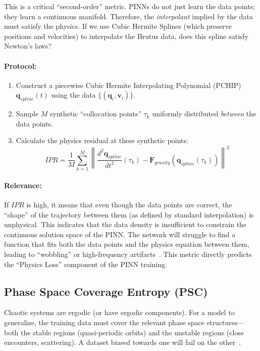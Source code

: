 \documentclass[11pt, a4paper]{article}
\newcommand{\vect}[1]{\mathbf{#1}} %
\begin{document}
This is a critical ``second-order'' metric. PINNs do not just learn the data points; they learn a continuous manifold. Therefore, the \textit{interpolant} implied by the data must satisfy the physics. If we use Cubic Hermite Splines (which preserve positions and velocities) to interpolate the Brutus data, does this spline satisfy Newton's laws?~\cite{ref16}

\paragraph{Protocol:}
\begin{enumerate}
    \item Construct a piecewise Cubic Hermite Interpolating Polynomial (PCHIP) $\vect{q}_{spline}(t)$ using the data $\{(\vect{q}_i, \vect{v}_i)\}$.
    \item Sample $M$ synthetic ``collocation points'' $\tau_k$ uniformly distributed \textit{between} the data points.
    \item Calculate the physics residual at these synthetic points:
    \begin{equation}
        IPR = \frac{1}{M} \sum_{k=1}^{M} \left\| \frac{d^2 \vect{q}_{spline}}{dt^2}(\tau_k) - \vect{F}_{gravity}(\vect{q}_{spline}(\tau_k)) \right\|^2
    \end{equation}
\end{enumerate}

\paragraph{Relevance:}
If $IPR$ is high, it means that even though the data points are correct, the ``shape'' of the trajectory between them (as defined by standard interpolation) is unphysical. This indicates that the data density is insufficient to constrain the continuous solution space of the PINN. The network will struggle to find a function that fits both the data points and the physics equation between them, leading to ``wobbling'' or high-frequency artifacts~\cite{ref16}. This metric directly predicts the ``Physics Loss'' component of the PINN training.

\subsection{Phase Space Coverage Entropy (PSC)}

Chaotic systems are ergodic (or have ergodic components). For a model to generalize, the training data must cover the relevant phase space structures—both the stable regions (quasi-periodic orbits) and the unstable regions (close encounters, scattering). A dataset biased towards one will fail on the other~\cite{ref28}.
\end{document}
